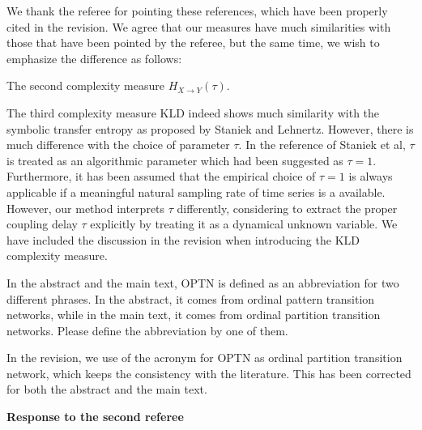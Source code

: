 \documentclass[aps,chaos,superscriptaddress,showkeys]{revtex4}
\begin{document}
\begin{center}
\begin{minipage}[c]{0.9\textwidth}
We thank the referee for pointing these references, which have been properly cited in the revision. We agree that our measures have much similarities with those that have been pointed by the referee, but the same time, we wish to emphasize the difference as follows: 

The second complexity measure $H_{X \to Y}(\tau)$. 


The third complexity measure KLD indeed shows much similarity with the symbolic transfer entropy as proposed by Staniek and Lehnertz. However, there is much difference with the choice of parameter $\tau$. In the reference of Staniek et al, $\tau$ is treated as an algorithmic parameter which had been suggested as $\tau = 1$. Furthermore, it has been assumed that the empirical choice of $\tau = 1$ is always applicable if a meaningful natural sampling rate of time series is a available. However, our method interprets $\tau$ differently, considering to extract the proper coupling delay $\tau$ explicitly by treating it as a dynamical unknown variable. We have included the discussion in the revision when introducing the KLD complexity measure. 
\end{minipage}
\end{center}


\noindent
{\sf In the abstract and the main text, OPTN is defined as an abbreviation for two different phrases. In the abstract, it comes from ordinal pattern transition networks, while in the main text, it comes from ordinal partition transition networks. Please define the abbreviation by one of them. }

\begin{center}
\begin{minipage}[c]{0.9\textwidth}
In the revision, we use of the acronym for OPTN as ordinal partition transition network, which keeps the consistency with the literature. This has been corrected for both the abstract and the main text. 
\end{minipage}
\end{center}

\vspace{0.4cm}
\begin{center}
{\bf Response to the second referee}
\end{center}


\end{document}
